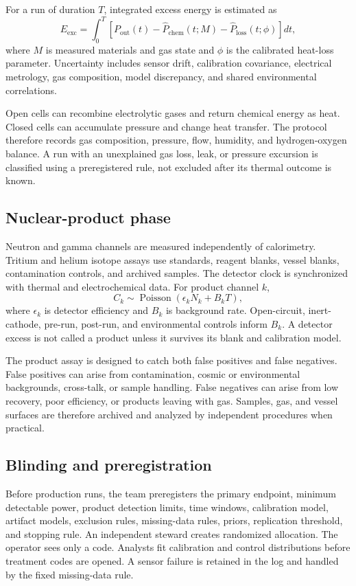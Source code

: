 \documentclass[conference]{IEEEtran}
\begin{document}
For a run of duration $T$, integrated excess energy is estimated as
\begin{equation}
E_{\mathrm{exc}}=\int_0^T\left[P_{\mathrm{out}}(t)-\widehat{P}_{\mathrm{chem}}(t;M)-\widehat{P}_{\mathrm{loss}}(t;\phi)\right]dt,
\label{eq:excess}
\end{equation}
where $M$ is measured materials and gas state and $\phi$ is the calibrated heat-loss parameter. Uncertainty includes sensor drift, calibration covariance, electrical metrology, gas composition, model discrepancy, and shared environmental correlations.

Open cells can recombine electrolytic gases and return chemical energy as heat. Closed cells can accumulate pressure and change heat transfer. The protocol therefore records gas composition, pressure, flow, humidity, and hydrogen-oxygen balance. A run with an unexplained gas loss, leak, or pressure excursion is classified using a preregistered rule, not excluded after its thermal outcome is known.

\subsection{Nuclear-product phase}
Neutron and gamma channels are measured independently of calorimetry. Tritium and helium isotope assays use standards, reagent blanks, vessel blanks, contamination controls, and archived samples. The detector clock is synchronized with thermal and electrochemical data. For product channel $k$,
\begin{equation}
C_k\sim\operatorname{Poisson}\left(\epsilon_k N_k+B_kT\right),
\label{eq:counts}
\end{equation}
where $\epsilon_k$ is detector efficiency and $B_k$ is background rate. Open-circuit, inert-cathode, pre-run, post-run, and environmental controls inform $B_k$. A detector excess is not called a product unless it survives its blank and calibration model.

The product assay is designed to catch both false positives and false negatives. False positives can arise from contamination, cosmic or environmental backgrounds, cross-talk, or sample handling. False negatives can arise from low recovery, poor efficiency, or products leaving with gas. Samples, gas, and vessel surfaces are therefore archived and analyzed by independent procedures when practical.

\subsection{Blinding and preregistration}
Before production runs, the team preregisters the primary endpoint, minimum detectable power, product detection limits, time windows, calibration model, artifact models, exclusion rules, missing-data rules, priors, replication threshold, and stopping rule. An independent steward creates randomized allocation. The operator sees only a code. Analysts fit calibration and control distributions before treatment codes are opened. A sensor failure is retained in the log and handled by the fixed missing-data rule.
\end{document}
